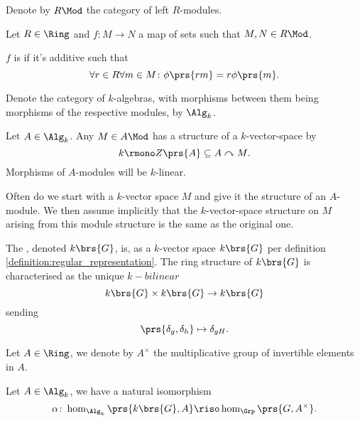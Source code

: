 \documentclass[10pt,a4paper,twoside,openany,hidelinks]{book}
\begin{document}
\begin{notation}
Denote by $R\Mod$ the category of left $R$-modules.
\end{notation}

\begin{definition}
Let $R \in \Ring$ and $f \colon M \to N$ a map of sets such that $M,N \in R\Mod$.

$f$ is  if it's additive such that
\[\forall r \in R \forall m \in M \colon \phi\prs{rm} = r \phi\prs{m} \text{.}\]
\end{definition}

\begin{notation}
Denote the category of $k$-algebras, with morphisms between them being morphisms of the respective modules, by $\Alg_k$.
\end{notation}

\begin{remark}
Let $A \in \Alg_k$.
Any $M \in A\Mod$ has a structure of a $k$-vector-space by
\[k \rmono Z\prs{A} \subseteq A \acts M \text{.}\]
Morphisms of $A$-modules will be $k$-linear. 

Often do we start with a $k$-vector space $M$ and give it the structure of an $A$-module.
We then assume implicitly that the $k$-vector-space structure on $M$ arising from this module structure is the same as the original one.
\end{remark}

\begin{definition}
The , denoted $k\brs{G}$, is, as a $k$-vector space $k\brs{G}$ per definition \ref{definition:regular_representation}.
The ring structure of $k\brs{G}$ is characterised as the unique $k-bilinear$
\[k\brs{G} \times k\brs{G} \to k\brs{G}\]
sending
\[\prs{\delta_g, \delta_h} \mapsto \delta_{gH} \text{.}\]
\end{definition}

\begin{notation}
Let $A \in \Ring$, we denote by $A^\times$
the multiplicative group of invertible elements in $A$.
\end{notation}

\begin{exercise}\label{exercise:multiplicative_group_adjoint}
Let $A \in \Alg_k$, we have a natural isomorphism
\[\alpha \colon \hom_{\Alg_k}\prs{k\brs{G}, A} \riso \hom_{\Grp}\prs{G, A^\times} \text{.}\]
\end{exercise}
\end{document}
